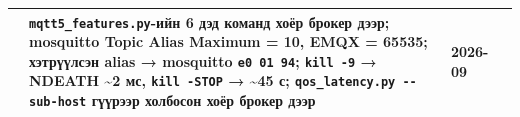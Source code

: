 \begin{longtable}[]{@{}llll@{}}
\begin{minipage}[t]{0.22\columnwidth}
\end{minipage} & \begin{minipage}[t]{0.22\columnwidth}\raggedright
\texttt{mqtt5\_\allowbreak{}features.\allowbreak{}py}-ийн 6 дэд команд хоёр брокер дээр; mosquitto Topic Alias Maximum = 10, EMQX = 65535; хэтрүүлсэн alias → mosquitto \texttt{e0\ 01\ 94}; \texttt{kill\ -9} → NDEATH \textasciitilde2 мс, \texttt{kill\ -STOP} → \textasciitilde45 с; \texttt{qos\_\allowbreak{}latency.\allowbreak{}py\ -\/\allowbreak{}-sub-host} гүүрээр холбосон хоёр брокер дээр\strut
\end{minipage} & \begin{minipage}[t]{0.22\columnwidth}\raggedright
2026-09\strut
\end{minipage}\tabularnewline
\bottomrule
\end{longtable}\endgroup
